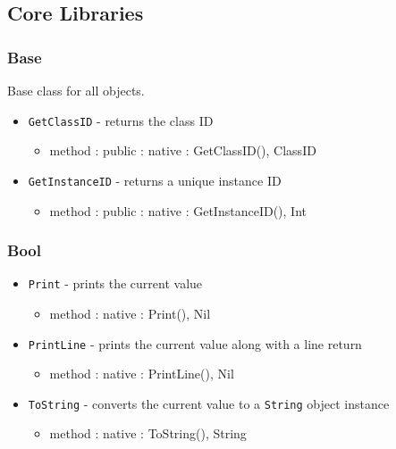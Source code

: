 \documentclass[12pt]{article}
\begin{document}
\subsection{Core Libraries}
\subsubsection{Base}
Base class for all objects.
\begin{itemize}
\item \texttt{GetClassID} - returns the class ID
  \begin{itemize}
  \item method : public : native : GetClassID(), ClassID
  \end{itemize}
\item \texttt{GetInstanceID} - returns a unique instance ID
  \begin{itemize}
  \item method : public : native : GetInstanceID(), Int
  \end{itemize}
\end{itemize}

\subsubsection{Bool}
\begin{itemize}
\item \texttt{Print} - prints the current value
  \begin{itemize}
  \item method : native : Print(), Nil
  \end{itemize}
\item \texttt{PrintLine} - prints the current value along with a line return
  \begin{itemize}
  \item method : native : PrintLine(), Nil
  \end{itemize} 
\item \texttt{ToString} - converts the current value to a \texttt{String} object instance
  \begin{itemize}
  \item method : native : ToString(), String
  \end{itemize}
\end{itemize}
\end{document}
